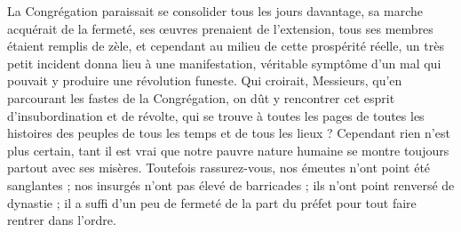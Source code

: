La Congrégation paraissait se consolider tous les jours davantage, sa marche acquérait de la fermeté, ses œuvres prenaient de l'extension, tous ses membres étaient remplis de zèle, et cependant au milieu de cette prospérité réelle, un très petit incident donna lieu à une manifestation, véritable symptôme d'un mal qui pouvait y produire une révolution funeste. Qui croirait, Messieurs, qu'en
parcourant les fastes de la Congrégation, on dût y rencontrer cet esprit d'insubordination et de révolte, qui se trouve à toutes les pages de toutes les histoires des peuples de tous les temps et de tous les lieux ? Cependant rien n'est plus certain, tant il est vrai que notre pauvre nature humaine se montre toujours partout avec ses misères. Toutefois rassurez-vous, nos émeutes n'ont point été sanglantes ; nos insurgés n'ont pas élevé de barricades ; ils n'ont point renversé de dynastie ; il a suffi d'un peu de fermeté de la part du préfet pour tout faire rentrer dans l'ordre.


